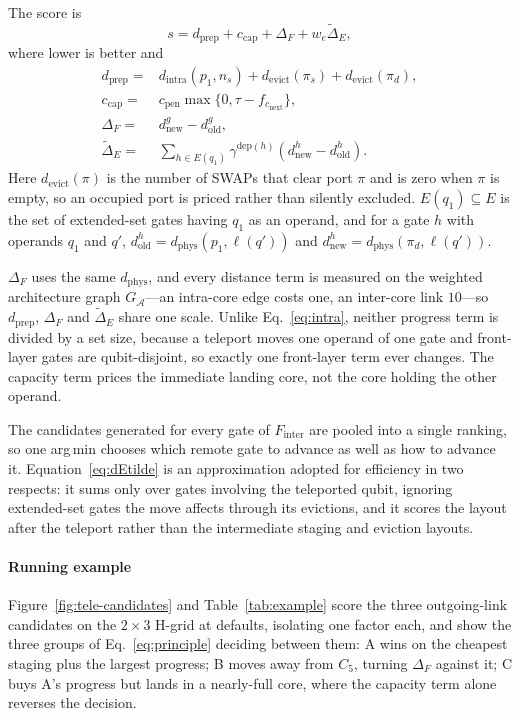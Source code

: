 \documentclass[journal]{IEEEtran}
\newcommand{\arch}{\mathcal{A}}
\newcommand{\dphys}{d_{\mathrm{phys}}}
\newcommand{\dintra}{d_{\mathrm{intra}}}
\begin{document}
The score is
\begin{equation}
s=d_{\mathrm{prep}}+c_{\mathrm{cap}}+\Delta_F+w_e\widetilde{\Delta}_E,
\label{eq:dsabre}
\end{equation}
where lower is better and
\begin{align}
d_{\mathrm{prep}}={}&\dintra(p_1,n_s)+d_{\mathrm{evict}}(\pi_s)+d_{\mathrm{evict}}(\pi_d), \\
c_{\mathrm{cap}}={}&c_{\mathrm{pen}}\max\{0,\tau-f_{c_{\mathrm{next}}}\}, \\
\Delta_F={}&d^g_{\mathrm{new}}-d^g_{\mathrm{old}}, \\
\widetilde{\Delta}_E={}&\sum_{h\in E(q_1)}\gamma^{\mathrm{dep}(h)}
\left(d^h_{\mathrm{new}}-d^h_{\mathrm{old}}\right).
\label{eq:dEtilde}
\end{align}
Here $d_{\mathrm{evict}}(\pi)$ is the number of SWAPs that clear port $\pi$ and is zero when $\pi$ is empty, so an occupied port is priced rather than silently excluded. $E(q_1)\subseteq E$ is the set of extended-set gates having $q_1$ as an operand, and for a gate $h$ with operands $q_1$ and $q'$, $d^h_{\mathrm{old}}=\dphys(p_1,\ell(q'))$ and $d^h_{\mathrm{new}}=\dphys(\pi_d,\ell(q'))$.

$\Delta_F$ uses the same $\dphys$, and every distance term is measured on the weighted architecture graph $G_\arch$---an intra-core edge costs one, an inter-core link $10$---so $d_{\mathrm{prep}}$, $\Delta_F$ and $\widetilde{\Delta}_E$ share one scale. Unlike Eq.~\eqref{eq:intra}, neither progress term is divided by a set size, because a teleport moves one operand of one gate and front-layer gates are qubit-disjoint, so exactly one front-layer term ever changes. The capacity term prices the immediate landing core, not the core holding the other operand.

The candidates generated for every gate of $F_{\mathrm{inter}}$ are pooled into a single ranking, so one arg\,min chooses which remote gate to advance as well as how to advance it. Equation~\eqref{eq:dEtilde} is an approximation adopted for efficiency in two respects: it sums only over gates involving the teleported qubit, ignoring extended-set gates the move affects through its evictions, and it scores the layout after the teleport rather than the intermediate staging and eviction layouts.

\paragraph*{Running example}
Figure~\ref{fig:tele-candidates} and Table~\ref{tab:example} score the three outgoing-link candidates on the $2{\times}3$ H-grid at defaults, isolating one factor each, and show the three groups of Eq.~\eqref{eq:principle} deciding between them: A wins on the cheapest staging plus the largest progress; B moves away from $C_5$, turning $\Delta_F$ against it; C buys A's progress but lands in a nearly-full core, where the capacity term alone reverses the decision.
\end{document}
